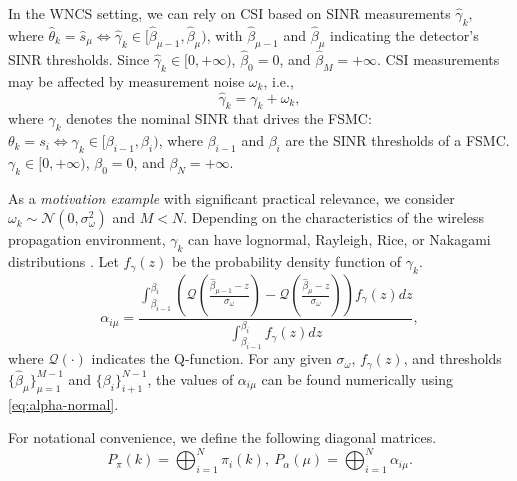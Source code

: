 \documentclass[journal,twoside,web]{ieeecolor}
\begin{document}
In the WNCS setting, we can rely on CSI based on SINR measurements $\hat{\gamma}_k$, where $\hat{\theta}_k = \hat{s}_{\mu} \Leftrightarrow\hat{\gamma}_k\in [\hat{\beta}_{\mu-1},\hat{\beta}_{\mu})$, with $\hat{\beta}_{\mu-1}$ and $\hat{\beta}_{\mu}$ indicating the detector's SINR thresholds. Since $\hat{\gamma}_k \in [0,+\infty)$, $\hat{\beta}_0 = 0$, and $\hat{\beta}_{M}=+\infty$. CSI measurements may be affected by measurement noise $\omega_k$, i.e., 
\begin{equation}\label{eq:gamma-hat}
    \hat{\gamma}_k = \gamma_k + \omega_k,
\end{equation}
where $\gamma_k$ denotes the nominal SINR that drives the FSMC: 
$\theta_k = s_{i} \Leftrightarrow\gamma_k\in [\beta_{i-1},\beta_{i})$, where $\beta_{i-1}$ and $\beta_{i}$ are the SINR thresholds of a FSMC. $\gamma_k \in [0,+\infty)$, $\beta_0 = 0$, and $\beta_{N}=+\infty$.

As a \emph{motivation example} with significant practical relevance, we consider $\omega_k \sim \mathcal{N}(0,\sigma_{\omega}^2)$ and $M<N$. 
Depending on the characteristics of the wireless propagation environment, $\gamma_k$ can have lognormal, Rayleigh, Rice, or Nakagami distributions \cite{stuber2017principles}. 
Let $f_{\gamma}(z)$ be the probability density function of $\gamma_k$. %
\begin{equation}\label{eq:alpha-normal}
    \alpha_{i\mu} = \frac{
    \int_{\beta_{i-1}}^{\beta_{i}}\left(
    \mathcal{Q}\left(\frac{\hat{\beta}_{\mu-1}-z}{\sigma_{\omega}}\right) - 
    \mathcal{Q}\left(\frac{\hat{\beta}_{\mu}-z}{\sigma_{\omega}}\right) 
    \right) f_{\gamma}(z)dz}{
    \int_{\beta_{i-1}}^{\beta_{i}} f_{\gamma}(z)dz},
\end{equation}
where $\mathcal{Q}(\cdot)$ indicates the Q-function. For any given $\sigma_{\omega}$, $f_{\gamma}(z)$, and %
thresholds $\{\hat{\beta}_{\mu}\}_{\mu=1}^{M-1}$ and $\{\beta_{i}\}_{i+1}^{N-1}$, the values of $\alpha_{i\mu}$ can be found numerically using \eqref{eq:alpha-normal}.

For notational convenience, we define the following diagonal matrices.
\begin{equation}\label{eq:epm}
     P_{\pi}^{}(k) = \bigoplus_{i=1}^{N} \pi_{i}(k),~P_{\alpha}^{}(\mu) = \bigoplus_{i=1}^{N} \alpha_{i\mu}.
\end{equation}
\end{document}
